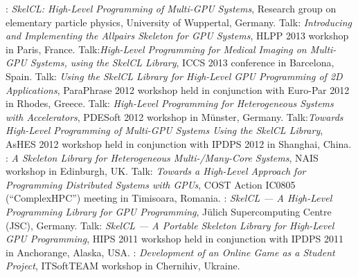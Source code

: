          {: \emph{SkelCL\@: High-Level Programming of Multi-GPU
          Systems}, \small Research group on elementary particle physics,
          University of Wuppertal, Germany.}
         {Talk: \emph{Introducing and Implementing the Allpairs Skeleton for GPU
          Systems}, \small HLPP 2013 workshop in Paris, France.}
         {Talk:\emph{High-Level Programming for Medical Imaging on Multi-GPU
          Systems, using the SkelCL Library}, \small ICCS 2013 conference in
          Barcelona, Spain.}
       {Talk: \emph{Using the SkelCL Library for High-Level GPU Programming of
        2D Applications}, \small ParaPhrase 2012 workshop held in
        conjunction with Euro-Par 2012 in Rhodes, Greece.}
       {Talk: \emph{High-Level Programming for Heterogeneous Systems with
        Accelerators}, \small PDESoft 2012 workshop in Münster, Germany.}
       {Talk:\emph{Towards High-Level Programming of Multi-GPU Systems Using
        the SkelCL Library}, \small AsHES 2012 workshop held in
        conjunction with IPDPS 2012 in Shanghai, China.}
       {: \emph{A Skeleton Library for Heterogeneous
        Multi-/Many-Core Systems}, \small NAIS workshop in Edinburgh, UK.}
       {Talk: \emph{Towards a High-Level Approach for Programming Distributed
        Systems with GPUs}, \small COST Action IC0805 (``ComplexHPC'')
        meeting in Timisoara, Romania.}
       {: \emph{SkelCL --- A High-Level Programming Library for GPU
        Programming}, \small Jülich Supercomputing Centre (JSC), Germany.}
       {Talk: \emph{SkelCL --- A Portable Skeleton Library for High-Level
        GPU Programming},
        \small HIPS 2011 workshop held in conjunction with IPDPS 2011 in
        Anchorange, Alaska, USA.}
       {: \emph{Development of an Online Game as a Student Project},
        \small ITSoftTEAM workshop in Chernihiv, Ukraine.}

